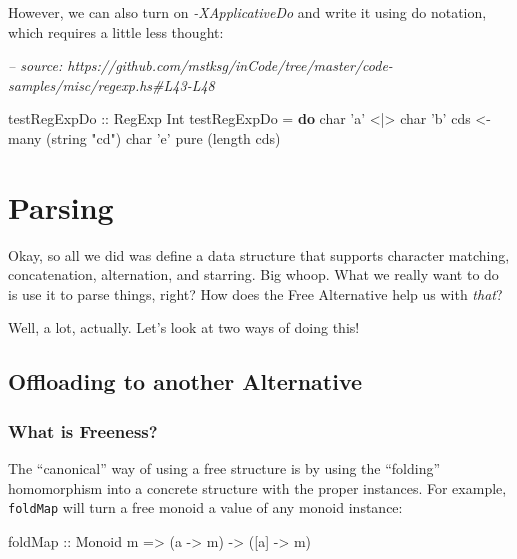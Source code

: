 \documentclass[]{article}
\newenvironment{Shaded}{}{}
\newcommand{\CharTok}[1]{\textcolor[rgb]{0.25,0.44,0.63}{#1}}
\newcommand{\CommentTok}[1]{\textcolor[rgb]{0.38,0.63,0.69}{\textit{#1}}}
\newcommand{\DataTypeTok}[1]{\textcolor[rgb]{0.56,0.13,0.00}{#1}}
\newcommand{\FunctionTok}[1]{\textcolor[rgb]{0.02,0.16,0.49}{#1}}
\newcommand{\KeywordTok}[1]{\textcolor[rgb]{0.00,0.44,0.13}{\textbf{#1}}}
\newcommand{\NormalTok}[1]{#1}
\newcommand{\OtherTok}[1]{\textcolor[rgb]{0.00,0.44,0.13}{#1}}
\newcommand{\StringTok}[1]{\textcolor[rgb]{0.25,0.44,0.63}{#1}}
\begin{document}
However, we can also turn on \emph{-XApplicativeDo} and write it using do
notation, which requires a little less thought:

\begin{Shaded}
\begin{Highlighting}[]
\CommentTok{-- source: https://github.com/mstksg/inCode/tree/master/code-samples/misc/regexp.hs#L43-L48}

\OtherTok{testRegExpDo ::} \DataTypeTok{RegExp} \DataTypeTok{Int}
\NormalTok{testRegExpDo }\FunctionTok{=} \KeywordTok{do}
\NormalTok{    char }\CharTok{'a'} \FunctionTok{<|>}\NormalTok{ char }\CharTok{'b'}
\NormalTok{    cds }\OtherTok{<-}\NormalTok{ many (string }\StringTok{"cd"}\NormalTok{)}
\NormalTok{    char }\CharTok{'e'}
    \FunctionTok{pure}\NormalTok{ (}\FunctionTok{length}\NormalTok{ cds)}
\end{Highlighting}
\end{Shaded}

\hypertarget{parsing}{%
\section{Parsing}\label{parsing}}

Okay, so all we did was define a data structure that supports character
matching, concatenation, alternation, and starring. Big whoop. What we really
want to do is use it to parse things, right? How does the Free Alternative help
us with \emph{that}?

Well, a lot, actually. Let's look at two ways of doing this!

\hypertarget{offloading-to-another-alternative}{%
\subsection{Offloading to another
Alternative}\label{offloading-to-another-alternative}}

\hypertarget{what-is-freeness}{%
\subsubsection{What is Freeness?}\label{what-is-freeness}}

The ``canonical'' way of using a free structure is by using the ``folding''
homomorphism into a concrete structure with the proper instances. For example,
\texttt{foldMap} will turn a free monoid a value of any monoid instance:

\begin{Shaded}
\begin{Highlighting}[]
\FunctionTok{foldMap}\OtherTok{ ::} \DataTypeTok{Monoid}\NormalTok{ m }\OtherTok{=>}\NormalTok{ (a }\OtherTok{->}\NormalTok{ m) }\OtherTok{->}\NormalTok{ ([a] }\OtherTok{->}\NormalTok{ m)}
\end{Highlighting}
\end{Shaded}
\end{document}
